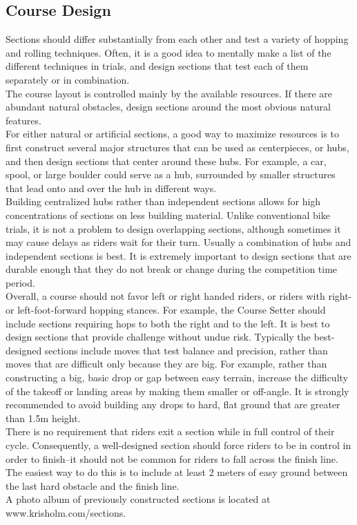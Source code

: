 \subsection{Course Design}
Sections should differ substantially from each other and test a variety of hopping and rolling techniques. Often, it is a
good idea to mentally make a list of the different techniques in trials, and design sections that test each of them
separately or in combination.\\
The course layout is controlled mainly by the available resources. If there are abundant natural obstacles, design
sections around the most obvious natural features.\\
For either natural or artificial sections, a good way to maximize resources is to first construct several major structures
that can be used as centerpieces, or hubs, and then design sections that center around these hubs. For example, a car,
spool, or large boulder could serve as a hub, surrounded by smaller structures that lead onto and over the hub in
different ways.\\
Building centralized hubs rather than independent sections allows for high concentrations of sections on less building
material. Unlike conventional bike trials, it is not a problem to design overlapping sections, although sometimes it may
cause delays as riders wait for their turn. Usually a combination of hubs and independent sections is best.
It is extremely important to design sections that are durable enough that they do not break or change during the
competition time period.\\
Overall, a course should not favor left or right handed riders, or riders with right- or left-foot-forward hopping stances.
For example, the Course Setter should include sections requiring hops to both the right and to the left.
It is best to design sections that provide challenge without undue risk. Typically the best-designed sections include
moves that test balance and precision, rather than moves that are difficult only because they are big. For example,
rather than constructing a big, basic drop or gap between easy terrain, increase the difficulty of the takeoff or landing
areas by making them smaller or off-angle. It is strongly recommended to avoid building any drops to hard, flat ground
that are greater than 1.5m height.\\
There is no requirement that riders exit a section while in full control of their cycle. Consequently, a well-designed
section should force riders to be in control in order to finish--it should not be common for riders to fall across the finish
line. The easiest way to do this is to include at least 2 meters of easy ground between the last hard obstacle and the
finish line.\\
A photo album of previously constructed sections is located at www.krisholm.com/sections.


